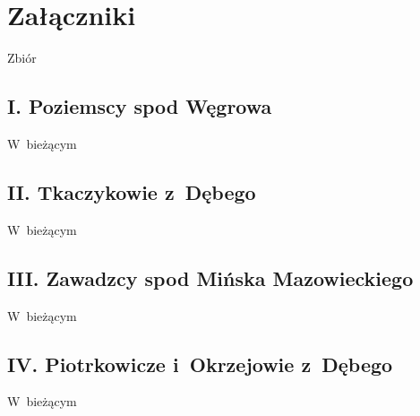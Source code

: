 \chapter*{Załączniki}

Zbiór

\section*{I. Poziemscy spod Węgrowa}

W~bieżącym

\section*{II. Tkaczykowie z~Dębego}

W~bieżącym


\section*{III. Zawadzcy spod Mińska Mazowieckiego}
\label{sec:zawadzcy}

W~bieżącym

\section*{IV. Piotrkowicze i~Okrzejowie z~Dębego}

W~bieżącym